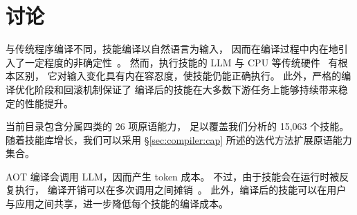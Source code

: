 \section{讨论}
\label{sec:discussion}

与传统程序编译不同，技能编译以自然语言为输入，
因而在编译过程中内在地引入了一定程度的非确定性~\cite{wang2023selfconsistency}。
然而，执行技能的 LLM 与 CPU 等传统硬件~\cite{hennessy2019architecture} 有根本区别，
它对输入变化具有内在容忍度，使技能仍能正确执行。
此外，\sys 严格的编译优化阶段和回滚机制保证了
编译后的技能在大多数下游任务上能够持续带来稳定的性能提升。

当前目录包含分属四类的 26 项原语能力，
足以覆盖我们分析的 15,063 个技能。
随着技能库增长，我们可以采用 \S\ref{sec:compiler:cap} 所述的迭代方法扩展原语能力集合。

AOT 编译会调用 LLM，因而产生 token 成本。
不过，由于技能会在运行时被反复执行，
编译开销可以在多次调用之间摊销~\cite{gray1981transaction}。
此外，编译后的技能可以在用户与应用之间共享，进一步降低每个技能的编译成本。
